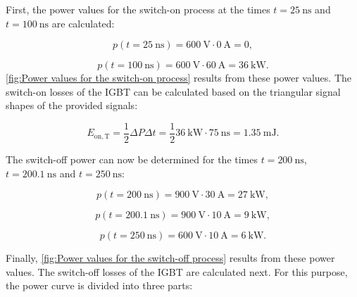 \begin{solutionblock}
First, the power values for the switch-on process at the times $t = \SI{25}{\ns}$ and $ t = \SI{100}{\ns}$ are calculated:

    \begin{equation}
        p(t = \SI{25}{\ns}) = \SI{600}{\volt} \cdot \SI{0}{\ampere} = 0,
    \end{equation}

    \begin{equation}
        p(t = \SI{100}{\ns}) = \SI{600}{\volt} \cdot \SI{60}{\ampere} = \SI{36}{\kilo\watt}. 
    \end{equation}
    \autoref{fig:Power values for the switch-on process}  results from these power values.
    The switch-on losses of the IGBT can be calculated based on the triangular signal shapes of the provided signals:
            
    \begin{equation}
    E_{\mathrm{on,T}} = \frac{1}{2} \Delta P \Delta t = \frac{1}{2} \SI{36}{\kilo\watt} \cdot \SI{75}{\ns} = \SI {1.35}{\milli\joule}.
    \end{equation}

    The switch-off power can now be determined for the times $t = \SI{200}{\ns}$, $t = \SI{200.1}{\ns}$ and $t = \SI{250}{\ns}$:

    \begin{equation}
        p(t = \SI{200}{\ns}) = \SI{900}{\volt} \cdot \SI{30}{\ampere} = \SI{27}{\kilo\watt}, 
    \end{equation}

    \begin{equation}
        p(t = \SI{200.1}{\ns}) = \SI{900}{\volt} \cdot \SI{10}{\ampere} = \SI{9}{\kilo\watt}, 
    \end{equation}

    \begin{equation}
        p(t = \SI{250}{\ns}) = \SI{600}{\volt} \cdot \SI{10}{\ampere} = \SI{6}{\kilo\watt}. 
    \end{equation}

Finally, \autoref{fig:Power values for the switch-off process} results from these power values. The switch-off losses of the IGBT are calculated next. For this purpose, the power curve is divided into three parts:
        

\end{solutionblock}
